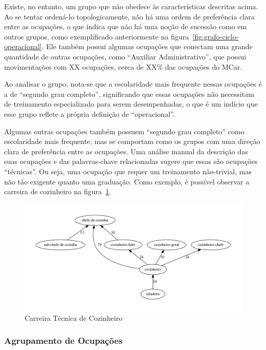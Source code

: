 \documentclass[12pt,a4paper]{article}
\theoremstyle{hypo}
\begin{document}
Existe, no entanto, um grupo que não obedece às características descritas acima. Ao se tentar ordená-lo topologicamente, não há uma ordem de preferência clara entre as ocupações, o que indica que não há uma noção de sucessão como em outros grupos, como exemplificado anteriormente na figura~\ref{fig:grafo-ciclo-operacional}. Ele também possui algumas ocupações que conectam uma grande quantidade de outras ocupações, como \enquote{Auxiliar Administrativo}, que possui movimentações com XX ocupações, cerca de XX\% das ocupações do MCar.

Ao analisar o grupo, nota-se que a escolaridade mais frequente nessas ocupações é a de \enquote{segundo grau completo}, significando que essas ocupações não necessitam de treinamento especializado para serem desempenhadas, o que é um indício que esse grupo reflete a própria definição de \enquote{operacional}.

Algumas outras ocupações também possuem \enquote{segundo grau completo} como escolaridade mais frequente, mas se comportam como os grupos com uma direção clara de preferência entre as ocupações. Uma análise manual da descrição das suas ocupações e das palavras-chave relacionadas sugere que essas são ocupações \enquote{técnicas}. Ou seja, uma ocupação que requer um treinamento não-trivial, mas não tão exigente quanto uma graduação. Como exemplo, é possível observar a carreira de cozinheiro na figura~\ref{fig:exemplo-grafo-cozinheiro}.

\begin{figure}[htb]
  \centering
  \includegraphics[scale=0.6]{subcluster_01_11.pdf}
  \caption{Carreira Técnica de Cozinheiro}
  \label{fig:exemplo-grafo-cozinheiro}
\end{figure}

\subsubsection{Agrupamento de Ocupações}
\end{document}
